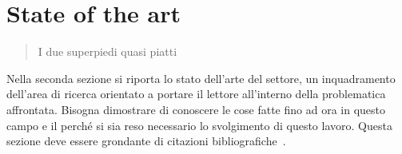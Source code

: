 \chapter{State of the art}
\label{chapter2}
\thispagestyle{empty}

\begin{quotation}
{\footnotesize
{}
\begin{flushright}
I due superpiedi quasi piatti
\end{flushright}
}
\end{quotation}
\vspace{0.5cm}

\noindent Nella seconda sezione si riporta lo stato dell'arte del settore, un inquadramento dell'area di ricerca orientato a portare il lettore all'interno della problematica affrontata. Bisogna dimostrare di conoscere le cose fatte fino ad ora in questo campo e il perch\'e si sia reso necessario lo svolgimento di questo lavoro. Questa sezione deve essere grondante di citazioni bibliografiche~\cite{marco02bud}.
